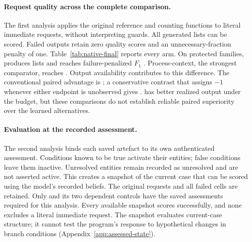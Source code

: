 \paragraph{Request quality across the complete comparison.}
The first analysis applies the original reference and counting functions to
literal immediate requests, without interpreting guards. All
\nrRequestObserved{} generated lists can be scored. Failed outputs retain
zero quality scores and an unnecessary-fraction penalty of one.
Table~\ref{tab:native-final} reports every arm. On protected families,
\casepath produces \rqHidCpN{} lists and reaches failure-penalized $F_1$
\rqHidCpF. Process-context, the strongest comparator, reaches \rqHidPcF.
Output availability contributes to this difference. The conventional paired
advantage is \rqHidDPcF; a conservative contrast that assigns $-1$ whenever
either endpoint is unobserved gives \rqHidCPcF. \casepath has better
realized output under the budget, but these comparisons do not establish
reliable paired superiority over the learned alternatives.

\begin{table}[t]
\centering\small
\setlength{\tabcolsep}{4pt}

\caption{Agreement of literal request lists with reference sets across the
complete corpus. This is a retrospective analysis. Domains receive equal
weight, as do families within a domain and cases within a family. Failed
outputs remain in the denominator; their ``Unnecessary'' penalty is one.
The dependent controls use the same recorded assessments.}
\label{tab:native-final}
\end{table}

\paragraph{Evaluation at the recorded assessment.}
The second analysis binds each saved artefact to its own authenticated
assessment. Conditions known to be true activate their entities; false
conditions leave them inactive. Unresolved entities remain recorded as
unresolved and are not asserted active. This creates a snapshot of the
current case that can be scored using the model's recorded beliefs. The
original requests and all failed cells are retained. Only \casepath and its
two dependent controls have the saved assessments required for this analysis.
Every available snapshot scores successfully, and none excludes a literal
immediate request. The snapshot evaluates current-case structure; it cannot
test the program's response to hypothetical changes in branch conditions
(Appendix~\ref{app:assessed-state}).

